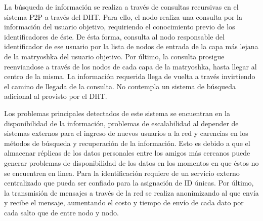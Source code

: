 La búsqueda de información se realiza a través de consultas recursivas en el
sistema P2P a través del DHT. Para ello, el nodo realiza una consulta
por la información del usuario objetivo, requiriendo el conocimiento previo de
los identificadores de éste. De ésta forma, consulta al nodo responsable del
identificador de ese usuario por la lista de nodos de entrada de la
capa más lejana de la matryoshka del usuario objetivo. Por último, la consulta
prosigue reenviandose a través de los nodos de cada capa de la matryoshka, hasta
llegar al centro de la misma. La información requerida llega de vuelta a través
invirtiendo el camino de llegada de la consulta.
No contempla un sistema de búsqueda adicional al provisto por el DHT.

Los problemas principales detectados de este sistema se encuentran en la
disponibilidad de la información, problemas de escalabilidad al depender de
sistemas externos para el ingreso de nuevos usuarios a la red y carencias en
los métodos de búsqueda y recuperación de la información.
Esto es debido a que el almacenar réplicas de los datos personales entre los amigos más cercanos
puede generar problemas de disponibilidad de los datos en los momentos en que
éstos no se encuentren en linea. Para la identificación requiere de un servicio
externo centralizado  que pueda ser confiado para la asignación de ID únicas.
Por último, la transmisión de mensajes a través de la red se realiza
anonimizando al que envía y recibe el mensaje, aumentando el costo y tiempo de
envío de cada dato por cada salto que de entre nodo y nodo.
